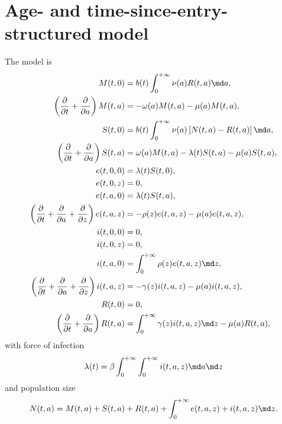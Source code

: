 \documentclass{jpmarticle}
\begin{document}
\section{Age- and time-since-entry-structured model}

The model is
\begin{equation}
  \label{model_age_and_time_since_entry_structured}
  \begin{split}
    M(t, 0) &=
    b(t) \int_0^{+\infty} \nu(a) R(t, a) \md a,
    \\
    \left(\frac{\partial}{\partial t}
      + \frac{\partial}{\partial a}\right)
    M(t, a) &=
    - \omega(a) M(t, a) - \mu(a) M(t, a),
    \\
    S(t, 0) &=
    b(t) \int_0^{+\infty} \nu(a) \left[N(t, a) - R(t, a)\right] \md a,
    \\
    \left(\frac{\partial}{\partial t}
      + \frac{\partial}{\partial a}\right)
    S(t, a) &=
    \omega(a) M(t, a) - \lambda(t) S(t, a) - \mu(a) S(t, a),
    \\
    e(t, 0, 0) &=
    \lambda(t) S(t, 0),
    \\
    e(t, 0, z) &=
    0,
    \\
    e(t, a, 0) &=
    \lambda(t) S(t, a),
    \\
    \left(\frac{\partial}{\partial t}
      + \frac{\partial}{\partial a}
      + \frac{\partial}{\partial z}\right)
    e(t, a, z) &=
    - \rho(z) e(t, a, z) - \mu(a) e(t, a, z),
    \\
    i(t, 0, 0) &=
    0,
    \\
    i(t, 0, z) &=
    0,
    \\
    i(t, a, 0) &=
    \int_0^{+\infty} \rho(z) e(t, a, z) \md z,
    \\
    \left(\frac{\partial}{\partial t}
      + \frac{\partial}{\partial a}
      + \frac{\partial}{\partial z}\right)
    i(t, a, z) &=
    - \gamma(z) i(t, a, z) - \mu(a) i(t, a, z),
    \\
    R(t, 0) &=
    0,
    \\
    \left(\frac{\partial}{\partial t}
      + \frac{\partial}{\partial a}\right)
    R(t, a) &=
    \int_0^{+\infty} \gamma(z) i(t, a, z) \md z
    - \mu(a) R(t, a),
  \end{split}
\end{equation}
with force of infection
\begin{equation}
  \lambda(t) =
  \beta
  \int_0^{+\infty} \int_0^{+\infty}
  i(t, a, z)
  \md a \md z
\end{equation}
and population size
\begin{equation}
  N(t, a) =
  M(t, a) + S(t, a) + R(t, a)
  + \int_0^{+\infty} e(t, a, z) + i(t, a, z) \md z.
\end{equation}
\end{document}
